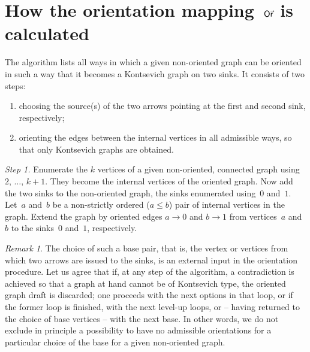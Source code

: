 \documentclass[a4paper]{jpconf}%
\theoremstyle{definition}
\theoremstyle{remark}
\newtheorem{rem}{Remark}%
\def\oldvec{\mathaccent "017E\relax } %
\DeclareMathOperator{\Ori}{\mathsf{O\oldvec{r}}}
\begin{document}
\section{How the orientation mapping~$\Ori$ is calculated%
}\label{SecOrient}
\noindent%
The algorithm lists all ways in which a given non-oriented graph can be oriented in such a way that it becomes a Kontsevich graph on two sinks. It consists of two steps: %
\begin{enumerate}
	\item choosing %
	the source(s) of the two arrows pointing at the first and second sink, respectively;
	\item orienting the edges between the internal vertices in all admissible ways, so that only Kontsevich graphs are obtained. %
\end{enumerate}

\smallskip\noindent%
{\textit{Step 1.}} Enumerate the $k$ vertices of a given non-oriented,
connected graph using~$2$, $\dots$, $k+1$. They become the internal vertices 
of the oriented graph. Now add the two sinks to the non\/-\/oriented graph, the sinks
enumerated using~$0$ and~$1$. Let~$a$ and~$b$ be a non\/-\/strictly ordered 
($a\leqslant b$) pair of internal vertices in the graph. Extend the graph by oriented edges $a\rightarrow 0$ and $b\rightarrow 1$ from vertices~$a$ and~$b$ to the sinks~$0$ and~$1$, respectively. 

\begin{rem} The choice of such a base pair, that is, the vertex or vertices from which two arrows are issued to the sinks, is an external input in the orientation procedure. %
Let us agree that if, at any step of the algorithm, a contradiction is achieved so that a graph at hand cannot be of Kontsevich type, the oriented graph draft is discarded; one proceeds with the next options in that loop, or if the former loop is finished, with the next level-up loops, or -- having returned to the choice of base vertices -- with the next base. In other words, we do not exclude in principle a possibility to have no admissible orientations for a particular choice of the base for a given non-oriented graph.
\end{rem}
\end{document}
